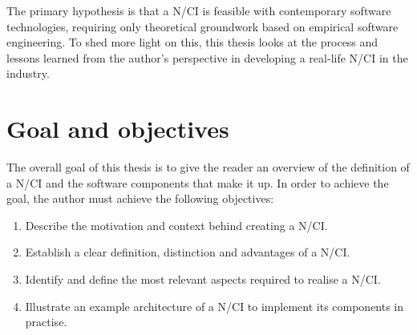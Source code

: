 The primary hypothesis is that a N/CI is feasible with contemporary software technologies, requiring only theoretical groundwork based on empirical software engineering. To shed more light on this, this thesis looks at the process and lessons learned from the author's perspective in developing a real-life N/CI in the industry.

\section{Goal and objectives}
\label{chapter1-goal-and-objectives}

The overall goal of this thesis is to give the reader an overview of the definition of a N/CI and the software components that make it up. In order to achieve the goal, the author must achieve the following objectives:

\begin{enumerate}
  \item Describe the motivation and context behind creating a N/CI.
  \item Establish a clear definition, distinction and advantages of a N/CI.
  \item Identify and define the most relevant aspects required to realise a N/CI.
  \item Illustrate an example architecture of a N/CI to implement its components in practise.
\end{enumerate}

